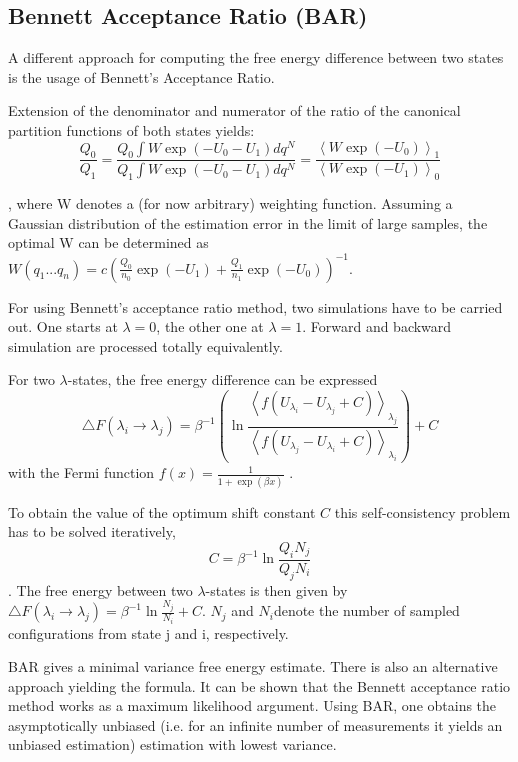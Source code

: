 \subsection{Bennett Acceptance Ratio (BAR)}

A different approach for computing the free energy difference between
two states is the usage of Bennett's Acceptance Ratio\cite{Bennett.1976}. 

Extension of the denominator and numerator of the ratio of the canonical
partition functions of both states yields: 
\[
\frac{Q_{0}}{Q_{1}}=\frac{Q_{0}\int W\exp\left(-U_{0}-U_{1}\right)dq^{N}}{Q_{1}\int W\exp\left(-U_{0}-U_{1}\right)dq^{N}}=\frac{\left\langle W\exp\left(-U_{0}\right)\right\rangle _{1}}{\left\langle W\exp\left(-U_{1}\right)\right\rangle _{0}}
\]

, where W denotes a (for now arbitrary) weighting function. Assuming
a Gaussian distribution of the estimation error in the limit of large
samples, the optimal W can be determined as $W\left(q_{1}...q_{n}\right)=c\left(\frac{Q_{0}}{n_{0}}\exp\left(-U_{1}\right)+\frac{Q_{1}}{n_{1}}\exp\left(-U_{0}\right)\right)^{-1}$\cite{Bennett.1976}. 

For using Bennett's acceptance ratio method, two simulations have
to be carried out. One starts at $\lambda=0$, the other one at $\lambda=1$.
Forward and backward simulation are processed totally equivalently. 

For two $\lambda$-states, the free energy difference can be expressed
\[
\bigtriangleup F\left(\lambda_{i}\rightarrow\lambda_{j}\right)=\beta^{-1}\left(\ln\frac{\left\langle f\left(U_{\lambda_{i}}-U_{\lambda_{j}}+C\right)\right\rangle _{\lambda_{j}}}{\left\langle f\left(U_{\lambda_{j}}-U_{\lambda_{i}}+C\right)\right\rangle _{\lambda_{i}}}\right)+C
\]
with the Fermi function $f\left(x\right)=\frac{1}{1+\exp\left(\beta x\right)}$
\cite{Bruckner.2011}\cite{Gapsys.2015}.

To obtain the value of the optimum shift constant $C$ this self-consistency
problem has to be solved iteratively\cite{Gapsys.2015}, 
\[
C=\beta^{-1}\ln\frac{Q_{i}N_{j}}{Q_{j}N_{i}}
\]
. The free energy between two $\lambda$-states is then given by $\bigtriangleup F\left(\lambda_{i}\rightarrow\lambda_{j}\right)=\beta^{-1}\ln\frac{N_{j}}{N_{i}}+C$\cite{Bruckner.2011}.
$N_{j}$ and $N_{i}$denote the number of sampled configurations from
state j and i, respectively.

BAR gives a minimal variance free energy estimate. There is also an
alternative approach yielding the formula. It can be shown that the
Bennett acceptance ratio method works as a maximum likelihood argument.
Using BAR, one obtains the asymptotically unbiased (i.e. for an infinite
number of measurements it yields an unbiased estimation) estimation
with lowest variance\cite{Shirts.2003}. 

